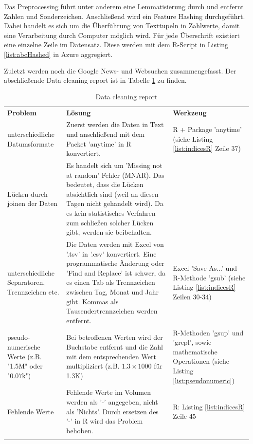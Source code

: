 
Das Preprocessing führt unter anderem eine Lemmatisierung durch und entfernt Zahlen und Sonderzeichen. Anschließend wird ein Feature Hashing durchgeführt. Dabei handelt es sich um die Überführung von Texttupeln in Zahlwerte, damit eine Verarbeitung durch Computer möglich wird. Für jede Überschrift existiert eine einzelne Zeile im Datensatz. Diese werden mit dem R-Script in Listing \ref{list:abcHashed} in Azure aggregiert.

Zuletzt werden noch die Google News- und Websuchen zusammengefasst. Der abschließende Data cleaning report ist in Tabelle \ref{tab:selecData} zu finden.

\begin{centering} \begin{longtable}[H]{|p{4cm}|p{8cm}|p{4cm}|}
\hline
\textbf{Problem} & \textbf{Lösung} & \textbf{Werkzeug} \\
\hhline{===} 
unterschiedliche Datumsformate & Zuerst werden die Daten in Text und anschließend mit dem Packet 'anytime' in R konvertiert. & R + Package 'anytime' (siehe Listing \ref{list:indicesR} Zeile 37) \\ \hline
Lücken durch joinen der Daten & Es handelt sich um 'Missing not at random'-Fehler (MNAR)\citep[S.~553]{graham_missing_2009}. Das bedeutet, dass die Lücken absichtlich sind (weil an diesen Tagen nicht gehandelt wird). Da es kein statistisches Verfahren zum schließen solcher Lücken gibt, werden sie beibehalten. \citep[S.~1109]{leonhart_dorsch_2014} & \\ \hline
unterschiedliche Separatoren, Trennzeichen etc. & Die Daten werden mit Excel von '.tsv' in '.csv' konvertiert. Eine programmatische Änderung oder 'Find and Replace' ist schwer, da es einen Tab als Trennzeichen zwischen Tag, Monat und Jahr gibt. Kommas als Tausendertrennzeichen werden entfernt. & Excel 'Save As...' und R-Methode 'gsub' (siehe Listing \ref{list:indicesR} Zeilen 30-34) \\ \hline
pseudo-numerische Werte (z.B. "1.5M" oder "0.07k") & Bei betroffenen Werten wird der Buchstabe entfernt und die Zahl mit dem entsprechenden Wert multipliziert (z.B. $ 1.3 \times 1000 $ für 1.3K) & R-Methoden 'gsup' und 'grepl', sowie mathematische Operationen (siehe Listing \ref{list:pseudonumeric})\\ \hline
Fehlende Werte & Fehlende Werte im Volumen werden als '-' angegeben, nicht als 'Nichts'. Durch ersetzen des '-' in R wird das Problem behoben. & R: Listing \ref{list:indicesR} Zeile 45 \\ \hline
\caption{Data cleaning report}
\label{tab:selecData}
\end{longtable} \end{centering}
